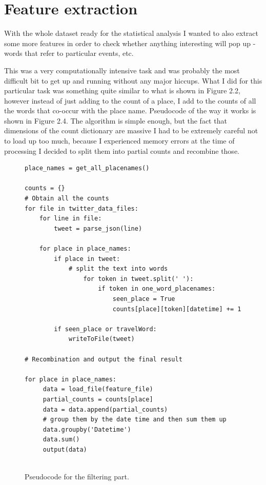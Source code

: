 \documentclass[minf,frontabs,twoside,singlespacing,parskip]{infthesis}
\begin{document}
\section{Feature extraction}
\label{feat-extraction}

With the whole dataset ready for the statistical analysis I wanted to also extract some more features in order to check whether anything interesting will pop up - words that refer to particular events, etc. 


This was a very computationally intensive task and was probably the most difficult bit to get up and running without any major hiccups. What I did for this particular task was something quite similar to what is shown in Figure 2.2, however instead of just adding to the count of a place, I add to the counts of all the words that co-occur with the place name.  Pseudocode of the way it works is shown in Figure 2.4. The algorithm is simple enough, but the fact that dimensions of the count dictionary are massive I had to be extremely careful not to load up too much, because I experienced memory errors at the time of processing I decided to split them into partial counts and recombine those. 


\begin{figure}[]
\begin{center}
\begin{lstlisting}
place_names = get_all_placenames()

counts = {}
# Obtain all the counts
for file in twitter_data_files:
    for line in file:
        tweet = parse_json(line)
  
  	for place in place_names:
	    if place in tweet:
	        # split the text into words
                for token in tweet.split(' '): 
                    if token in one_word_placenames:
                        seen_place = True
                        counts[place][token][datetime] += 1

        if seen_place or travelWord:
            writeToFile(tweet)
            
# Recombination and output the final result

for place in place_names:
     data = load_file(feature_file)
     partial_counts = counts[place]
     data = data.append(partial_counts)
     # group them by the date time and then sum them up
     data.groupby('Datetime')
     data.sum()
     output(data)
    
\end{lstlisting}
\end{center}
\caption{Pseudocode for the filtering part. }
\end{figure}
\end{document}
